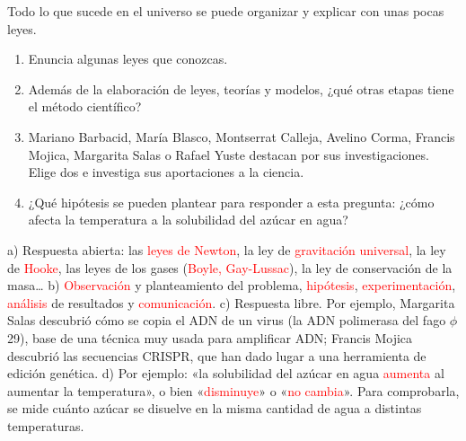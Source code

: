 \begin{exercise}
    Todo lo que sucede en el universo se puede organizar y explicar con unas pocas leyes.
    \begin{enumerate}[label=\alph*)]
        \item Enuncia algunas leyes que conozcas.
        \item Además de la elaboración de leyes, teorías y modelos, ¿qué otras etapas tiene el método científico?
        \item Mariano Barbacid, María Blasco, Montserrat Calleja, Avelino Corma, Francis Mojica, Margarita Salas o Rafael Yuste destacan por sus investigaciones. Elige dos e investiga sus aportaciones a la ciencia.
        \item ¿Qué hipótesis se pueden plantear para responder a esta pregunta: ¿cómo afecta la temperatura a la solubilidad del azúcar en agua?
    \end{enumerate}
    \begin{solu}
        a) Respuesta abierta: las \textcolor{red}{leyes de Newton}, la ley de \textcolor{red}{gravitación universal}, la ley de \textcolor{red}{Hooke}, las leyes de los gases (\textcolor{red}{Boyle, Gay-Lussac}), la ley de conservación de la masa\ldots
        b) \textcolor{red}{Observación} y planteamiento del problema, \textcolor{red}{hipótesis}, \textcolor{red}{experimentación}, \textcolor{red}{análisis} de resultados y \textcolor{red}{comunicación}.
        c) Respuesta libre. Por ejemplo, Margarita Salas descubrió cómo se copia el ADN de un virus (la ADN polimerasa del fago \(\phi\)29), base de una técnica muy usada para amplificar ADN; Francis Mojica descubrió las secuencias CRISPR, que han dado lugar a una herramienta de edición genética.
        d) Por ejemplo: «la solubilidad del azúcar en agua \textcolor{red}{aumenta} al aumentar la temperatura», o bien «\textcolor{red}{disminuye}» o «\textcolor{red}{no cambia}». Para comprobarla, se mide cuánto azúcar se disuelve en la misma cantidad de agua a distintas temperaturas.
    \end{solu}
\end{exercise}

